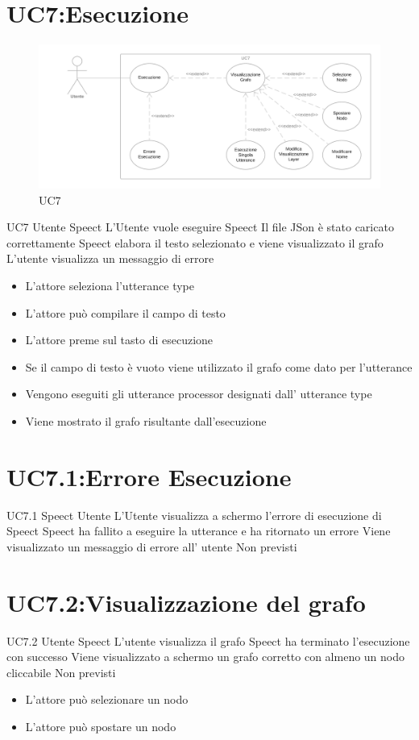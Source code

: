 \documentclass[../AnalisideiRequisiti.tex]{subfiles}
\begin{document}
\section{UC7:Esecuzione}
\begin{figure}[htp]
	\caption{UC7}
	\centering
	\includegraphics[width=\textwidth]{../img/UC07.png}
\end{figure}
\UserCase
{UC7}
{Utente}
{Speect}
{L'Utente vuole eseguire Speect}
{Il file JSon è stato caricato correttamente}
{Speect elabora il testo selezionato e viene visualizzato il grafo}
{L'utente visualizza un messaggio di errore }
{\begin{itemize}
		\item{} L'attore seleziona l'utterance type
		\item{} L'attore può compilare il campo di testo
		\item{} L'attore preme sul tasto di esecuzione
		\item{} Se il campo di testo è vuoto viene utilizzato il grafo come dato per l'utterance
		\item{} Vengono eseguiti gli utterance processor designati dall' utterance type
		\item{} Viene mostrato il grafo risultante dall'esecuzione
	\end{itemize}
}

\section{UC7.1:Errore Esecuzione}
\UserCase
{UC7.1}
{Speect}
{Utente}
{L'Utente visualizza a schermo l'errore di esecuzione di Speect }
{Speect ha fallito a eseguire la utterance e ha ritornato un errore}
{Viene visualizzato un messaggio di errore all' utente}
{Non previsti}
{}
\section{UC7.2:Visualizzazione del grafo}
\UserCase
{UC7.2}
{Utente}
{Speect}
{L'utente visualizza il grafo}
{Speect ha terminato l'esecuzione con successo}
{Viene visualizzato a schermo un grafo corretto con almeno un nodo cliccabile}
{Non previsti}
{
	\begin{itemize}
		\item{} L'attore può selezionare un nodo 
		\item{} L'attore può spostare un nodo 
	\end{itemize}
}
\end{document}
